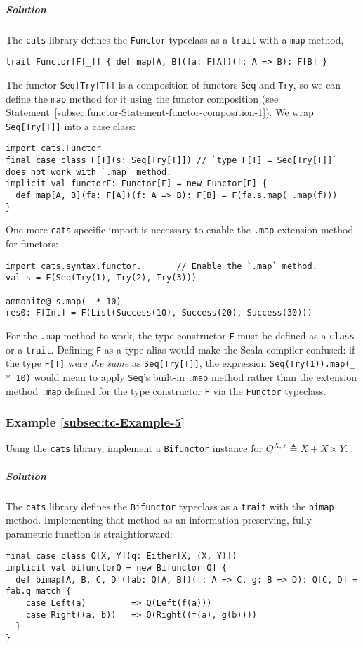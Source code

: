 \subparagraph{Solution}

The \texttt{cats} library defines the \lstinline!Functor! typeclass
as a \lstinline!trait! with a \lstinline!map! method,
\begin{lstlisting}
trait Functor[F[_]] { def map[A, B](fa: F[A])(f: A => B): F[B] }
\end{lstlisting}
The functor \lstinline!Seq[Try[T]]! is a composition of functors
\lstinline!Seq! and \lstinline!Try!, so we can define the \lstinline!map!
method for it using the functor composition (see Statement~\ref{subsec:functor-Statement-functor-composition-1}).
We wrap \lstinline!Seq[Try[T]]! into a case class:
\begin{lstlisting}
import cats.Functor
final case class F[T](s: Seq[Try[T]]) // `type F[T] = Seq[Try[T]]` does not work with `.map` method.
implicit val functorF: Functor[F] = new Functor[F] {
  def map[A, B](fa: F[A])(f: A => B): F[B] = F(fa.s.map(_.map(f)))
}
\end{lstlisting}
One more \texttt{cats}-specific import is necessary to enable the
\lstinline!.map! extension method for functors:
\begin{lstlisting}
import cats.syntax.functor._      // Enable the `.map` method.
val s = F(Seq(Try(1), Try(2), Try(3)))

ammonite@ s.map(_ * 10)
res0: F[Int] = F(List(Success(10), Success(20), Success(30)))
\end{lstlisting}
For the \lstinline!.map! method to work, the type constructor \lstinline!F!
must be defined as a \lstinline!class! or a \lstinline!trait!. Defining
\lstinline!F! as a type alias would make the Scala compiler confused:
if the type \lstinline!F[T]! were \emph{the same} as \lstinline!Seq[Try[T]]!,
the expression \lstinline!Seq(Try(1)).map(_ * 10)! would mean to
apply \lstinline!Seq!'s built-in \lstinline!.map! method rather
than the extension method \lstinline!.map! defined for the type constructor
\lstinline!F! via the \lstinline!Functor! typeclass.

\subsubsection{Example \label{subsec:tc-Example-5}\ref{subsec:tc-Example-5}}

Using the \texttt{cats} library, implement a \lstinline!Bifunctor!
instance for $Q^{X,Y}\triangleq X+X\times Y$.

\subparagraph{Solution}

The \texttt{cats} library defines the \lstinline!Bifunctor! typeclass
as a \lstinline!trait! with the \lstinline!bimap! method. Implementing
that method as an information-preserving, fully parametric function
is straightforward:
\begin{lstlisting}
final case class Q[X, Y](q: Either[X, (X, Y)])
implicit val bifunctorQ = new Bifunctor[Q] {
  def bimap[A, B, C, D](fab: Q[A, B])(f: A => C, g: B => D): Q[C, D] = fab.q match {
    case Left(a)         => Q(Left(f(a)))
    case Right((a, b))   => Q(Right((f(a), g(b))))
  }
}
\end{lstlisting}


